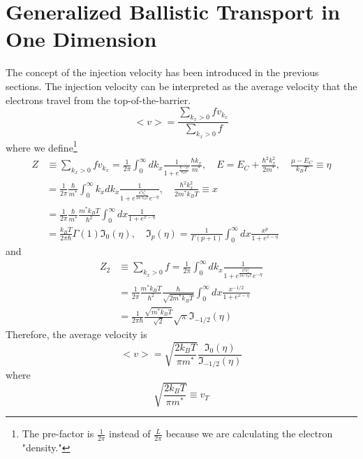 \section{Generalized Ballistic Transport in One Dimension}
The concept of the injection velocity has been introduced in the previous sections. The injection velocity can be interpreted as the average velocity that the electrons travel from the top-of-the-barrier. \begin{equation}
    \big<v\big> = \frac{\sum_{k_{x}>0}{fv_{k_{x}}}}{\sum_{k_{x}>0}{f}}
\end{equation} where we define\footnote{The pre-factor is $\frac{1}{2\pi}$ instead of $\frac{L}{2\pi}$ because we are calculating the electron "density."} \begin{align}
    Z& \equiv \sum_{k_{x}>0}{fv_{k_{x}}} = \frac{1}{2\pi}\int_{0}^{\infty}dk_{x}\frac{1}{1+e^{\frac{E-\mu}{k_{B}T}}}\frac{\hbar k_{x}}{m^{*}},\quad E=E_{C}+\frac{\hbar^{2}k_{x}^{2}}{2m^{*}},\quad \frac{\mu-E_{C}}{k_{B}T}\equiv \eta \nonumber\\
    & = \frac{1}{2\pi}\frac{\hbar}{m^{*}}\int_{0}^{\infty}k_{x}dk_{x}\frac{1}{1+e^{\frac{\hbar^{2}k_{x}^{2}}{2m^{*}k_{B}T}}e^{-\eta}},\quad \frac{\hbar^{2}k_{x}^{2}}{2m^{*}k_{B}T}\equiv x\nonumber\\
    & = \frac{1}{2\pi}\frac{\hbar}{m^{*}}\frac{m^{*}k_{B}T}{\hbar^{2}}\int_{0}^{\infty}dx\frac{1}{1+e^{x-\eta}}\nonumber\\
    & = \frac{k_{B}T}{2\pi\hbar}\Gamma(1)\Im_{0}(\eta),\quad \Im_{p}(\eta) = \frac{1}{\Gamma(p+1)}\int_{0}^{\infty}dx\frac{x^{p}}{1+e^{x-\eta}}
\end{align} and \begin{align}
    Z_{2}& \equiv \sum_{k_{x}>0}{f} = \frac{1}{2\pi}\int_{0}^{\infty}dk_{x}\frac{1}{1+e^{\frac{\hbar^{2}k_{x}^{2}}{2m^{*}k_{B}T}}e^{-\eta}}\nonumber\\
    & = \frac{1}{2\pi}\frac{m^{*}k_{B}T}{\hbar^{2}}\frac{\hbar}{\sqrt{2m^{*}k_{B}T}}\int_{0}^{\infty}dx\frac{x^{-1/2}}{1+e^{x-\eta}}\nonumber\\
    & = \frac{1}{2\pi\hbar}\frac{\sqrt{m^{*}k_{B}T}}{\sqrt{2}}\sqrt{\pi}\Im_{-1/2}(\eta)
\end{align} Therefore, the average velocity is \begin{equation}
    \big<v\big> = \sqrt{\frac{2k_{B}T}{\pi m^{*}}}\frac{\Im_{0}(\eta)}{\Im_{-1/2}(\eta)}
\end{equation} where \begin{equation}
    \sqrt{\frac{2k_{B}T}{\pi m^{*}}} \equiv v_{T}

\end{equation}
